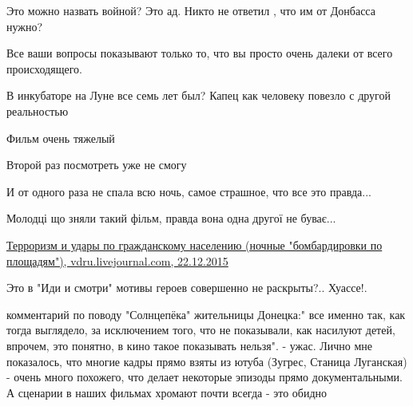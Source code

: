\begin{itemize}
Это можно назвать войной? Это ад. Никто не ответил , что им от Донбасса нужно?

 
Все ваши вопросы показывают только то, что вы просто очень далеки от всего происходящего.

 
В инкубаторе на Луне все семь лет был? Капец как человеку повезло с другой реальностью

 
Фильм очень тяжелый

Второй раз посмотреть уже не смогу

И от одного раза не спала всю ночь, самое страшное, что все это правда...

 
Молодці що зняли такий фільм, правда вона одна другої не буває...


\href{http://vdru.livejournal.com/17405.html}{%
Терроризм и удары по гражданскому населению (ночные "бомбардировки по площадям"), vdru.livejournal.com, 22.12.2015%
}


Это в "Иди и смотри" мотивы героев совершенно не раскрыты?.. Хуассе!.

 
комментарий по поводу "Солнцепёка" жительницы Донецка:" все именно так, как
тогда выглядело, за исключением того, что не показывали, как насилуют детей,
впрочем, это понятно, в кино такое показывать нельзя". - ужас. Лично мне
показалось, что многие кадры прямо взяты из ютуба (Зугрес, Станица Луганская) -
очень много похожего, что делает некоторые эпизоды прямо документальными. А
сценарии в наших фильмах хромают почти всегда - это обидно


\end{itemize}
